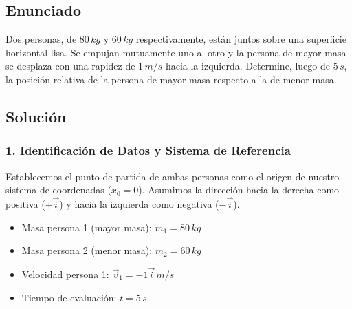 \documentclass[12pt, a4paper]{article}
\begin{document}
\newpage

\subsection*{Enunciado}
Dos personas, de $80 \, \si{kg}$ y $60 \, \si{kg}$ respectivamente, están juntos sobre una superficie horizontal lisa. Se empujan mutuamente uno al otro y la persona de mayor masa se desplaza con una rapidez de $1 \, \si{m/s}$ hacia la izquierda. Determine, luego de $5 \, \si{s}$, la posición relativa de la persona de mayor masa respecto a la de menor masa.

\begin{center}
\end{center}

\subsection*{Solución}

\subsubsection*{1. Identificación de Datos y Sistema de Referencia}
Establecemos el punto de partida de ambas personas como el origen de nuestro sistema de coordenadas ($x_0 = 0$). Asumimos la dirección hacia la derecha como positiva ($+\vec{i}$) y hacia la izquierda como negativa ($-\vec{i}$).
\begin{itemize}
    \item Masa persona 1 (mayor masa): $m_1 = 80 \, \si{kg}$
    \item Masa persona 2 (menor masa): $m_2 = 60 \, \si{kg}$
    \item Velocidad persona 1: $\vec{v}_1 = -1 \vec{i} \, \si{m/s}$
    \item Tiempo de evaluación: $t = 5 \, \si{s}$
\end{itemize}
\end{document}
